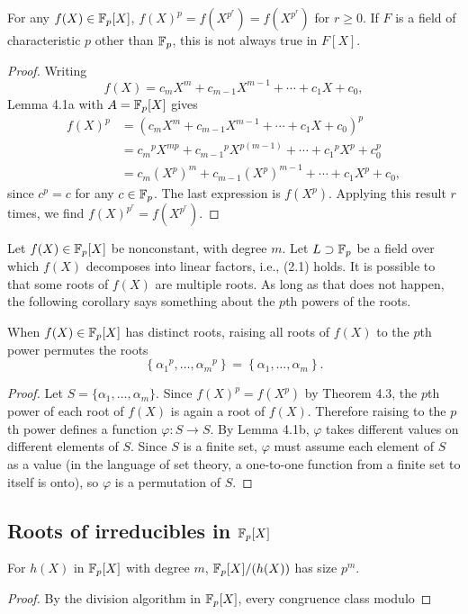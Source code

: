 \begin{theorem}
  For any $f(X)\in\mathbb{F}_p[X]$, $f(X)^p=f(X^{p^r})=f(X^{p^r})$ for $r\geq
  0$. If $F$ is a field of characteristic $p$ other than $\mathbb{F}_p$, this is
  not always true in $F[X]$.
\end{theorem}
\begin{proof}
  Writing
  \[
    f(X)=c_mX^m+c_{m-1}X^{m-1}+\cdots+c_1X+c_0,
  \]
  Lemma 4.1a with $A=\mathbb{F}_p[X]$ gives
  \begin{align*}
    f(X)^p
    &=\left( c_mX^m+c_{m-1}X^{m-1}+\cdots+c_1X+c_0 \right)^p\\
    &={c_m}^pX^{mp}+{c_{m-1}}^pX^{p(m-1)}+\cdots+{c_1}^pX^p+c_0^p\\
    &=c_m{(X^p)}^m+c_{m-1}{(X^p)}^{m-1}+\cdots+c_1X^p+c_0,
  \end{align*}
  since $c^p=c$ for any $c\in\mathbb{F}_p$. The last expression is
  $f(X^p)$. Applying this result $r$ times, we find
  $f(X)^{p^r}=f(X^{p^r})$.
\end{proof}

Let $f(X)\in\mathbb{F}_p[X]$ be nonconstant, with degree $m$. Let
$L\supset\mathbb{F}_p$ be a field over which $f(X)$ decomposes into linear
factors, i.e., (2.1) holds. It is possible to that some roots of $f(X)$ are
multiple roots. As long as that does not happen, the following corollary
says something about the $p$th powers of the roots.

\begin{corollary}
  When $f(X)\in\mathbb{F}_p[X]$ has distinct roots, raising all roots of $f(X)$
  to the $p$th power permutes the roots
  \[
    \left\{{\alpha_1}^p,\ldots,{\alpha_m}^p\right\}=\left\{{\alpha_1},\ldots,{\alpha_m}\right\}.
  \]
\end{corollary}
\begin{proof}
  Let $S=\{\alpha_1,\ldots,\alpha_m\}$. Since $f(X)^p=f(X^p)$ by Theorem
  4.3, the $p$th power of each root of $f(X)$ is again a root of
  $f(X)$. Therefore raising to the $p$th power defines a function
  $\varphi\colon S\to S$. By Lemma 4.1b, $\varphi$ takes different values
  on different elements of $S$. Since $S$ is a finite set, $\varphi$ must
  assume each element of $S$ as a value (in the language of set theory, a
  one-to-one function from a finite set to itself is onto), so $\varphi$ is
  a permutation of $S$.
\end{proof}

\subsection[Roots of irreducibles in FpX]{Roots of irreducibles in
  $\mathbb{F}_p[X]$}
\begin{lemma}
  For $h(X)$ in $\mathbb{F}_p[X]$ with degree $m$, $\mathbb{F}_p[X]/(h(X))$ has size
  $p^m$.
\end{lemma}
\begin{proof}
  By the division algorithm in $\mathbb{F}_p[X]$, every congruence class modulo
\end{proof}


